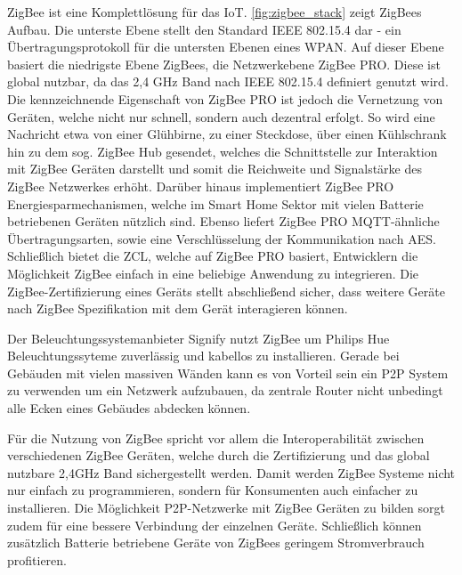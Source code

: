ZigBee ist eine Komplettlösung für das \ac{IoT}.
\autoref{fig:zigbee_stack} zeigt ZigBees Aufbau.
Die unterste Ebene stellt den Standard IEEE 802.15.4 dar - ein Übertragungsprotokoll für die untersten Ebenen eines \ac{WPAN}.
Auf dieser Ebene basiert die niedrigste Ebene ZigBees, die Netzwerkebene ZigBee PRO.
Diese ist global nutzbar, da das 2,4 GHz Band nach IEEE 802.15.4 definiert genutzt wird.
Die kennzeichnende Eigenschaft von ZigBee PRO ist jedoch die Vernetzung von Geräten, welche nicht nur schnell, sondern auch dezentral erfolgt.
So wird eine Nachricht etwa von einer Glühbirne, zu einer Steckdose, über einen Kühlschrank hin zu dem sog. ZigBee Hub gesendet, welches die Schnittstelle zur Interaktion mit ZigBee Geräten darstellt und somit die Reichweite und Signalstärke des ZigBee Netzwerkes erhöht.
Darüber hinaus implementiert ZigBee PRO Energiesparmechanismen, welche im Smart Home Sektor mit vielen Batterie betriebenen Geräten nützlich sind.
Ebenso liefert ZigBee PRO \ac{MQTT}-ähnliche Übertragungsarten, sowie eine Verschlüsselung der Kommunikation nach \ac{AES}.
Schließlich bietet die \ac{ZCL}, welche auf ZigBee PRO basiert, Entwicklern die Möglichkeit ZigBee einfach in eine beliebige Anwendung zu integrieren.
Die ZigBee-Zertifizierung eines Geräts stellt abschließend sicher, dass weitere Geräte nach ZigBee Spezifikation mit dem Gerät interagieren können.

Der Beleuchtungssystemanbieter Signify nutzt ZigBee um Philips Hue Beleuchtungssyteme zuverlässig und kabellos zu installieren.
Gerade bei Gebäuden mit vielen massiven Wänden kann es von Vorteil sein ein \ac{P2P} System zu verwenden um ein Netzwerk aufzubauen, da zentrale Router nicht unbedingt alle Ecken eines Gebäudes abdecken können.

Für die Nutzung von ZigBee spricht vor allem die Interoperabilität zwischen verschiedenen ZigBee Geräten, welche durch die Zertifizierung und das global nutzbare 2,4GHz Band sichergestellt werden.
Damit werden ZigBee Systeme nicht nur einfach zu programmieren, sondern für Konsumenten auch einfacher zu installieren.
Die Möglichkeit \ac{P2P}-Netzwerke mit ZigBee Geräten zu bilden sorgt zudem für eine bessere Verbindung der einzelnen Geräte.
Schließlich können zusätzlich Batterie betriebene Geräte von ZigBees geringem Stromverbrauch profitieren.

